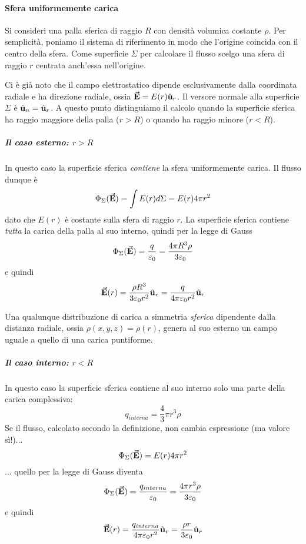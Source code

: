\paragraph{Sfera uniformemente carica}
Si consideri una palla sferica di raggio $R$ con densità volumica costante $\rho$. Per semplicità, poniamo il sistema di riferimento in modo che l'origine coincida con il centro della sfera. Come superficie $\Sigma$ per calcolare il flusso scelgo una sfera di raggio $r$ centrata anch'essa nell'origine.

Ci è già noto che il campo elettrostatico dipende esclusivamente dalla coordinata radiale e ha direzione radiale, ossia $\vb*{\va{E}}=E(r)\hat{\mathbf{u}}_r$. Il versore normale alla superficie $\Sigma$ è $\hat{\mathbf{u}}_n=\hat{\mathbf{u}}_r$.
A questo punto distinguiamo il calcolo quando la superficie sferica ha raggio maggiore della palla ($r>R$) o quando ha raggio minore ($r<R$).
\subparagraph{Il caso esterno: $r>R$}
In questo caso la superficie sferica \textit{contiene} la sfera uniformemente carica. Il flusso dunque è
\begin{equation*}
	\Phi_{\Sigma}(\vb*{\va{E}})=\int E(r)d\Sigma=E(r)4\pi r^2
\end{equation*}
dato che $E(r)$ è costante sulla sfera di raggio $r$.
La superficie sferica contiene \textit{tutta} la carica della palla al suo interno, quindi per la legge di Gauss
\begin{equation*}
	\Phi_{\Sigma}(\vb*{\va{E}})=\frac{q}{\varepsilon_0}=\frac{4 \pi R^3\rho}{3\varepsilon_0}
\end{equation*}
e quindi
\begin{equation}
	\vb*{\va{E}}(r)=\frac{\rho R^3}{3\varepsilon_0r^2}\hat{\mathbf{u}}_r=\frac{q}{4\pi\varepsilon_0 r^2}\hat{\mathbf{u}}_r
\end{equation}
\begin{observe}
	Una qualunque distribuzione di carica a simmetria \textit{sferica} dipendente dalla distanza radiale, ossia $\rho(x,y,z)=\rho(r)$, genera al suo esterno un campo uguale a quello di una carica puntiforme.
\end{observe}
\subparagraph{Il caso interno: $r<R$}
In questo caso la superficie sferica contiene al suo interno solo una parte della carica complessiva:
\begin{equation*}
	q_{interna}=\frac{4}{3}\pi r^3\rho
\end{equation*}
Se il flusso, calcolato secondo la definizione, non cambia espressione (ma valore sì!)...
\begin{equation*}
	\Phi_{\Sigma}(\vb*{\va{E}})=E(r)4\pi r^2
\end{equation*}
... quello per la legge di Gauss diventa
\begin{equation*}
	\Phi_{\Sigma}(\vb*{\va{E}})=\frac{q_{interna}}{\varepsilon_0}=\frac{4 \pi r^3\rho}{3\varepsilon_0}
\end{equation*}
e quindi
\begin{equation}
\vb*{\va{E}}(r)=\frac{q_{interna}}{4\pi\varepsilon_0 r^2}\hat{\mathbf{u}}_r=\frac{\rho r}{3\varepsilon_0}\hat{\mathbf{u}}_r
\end{equation}

